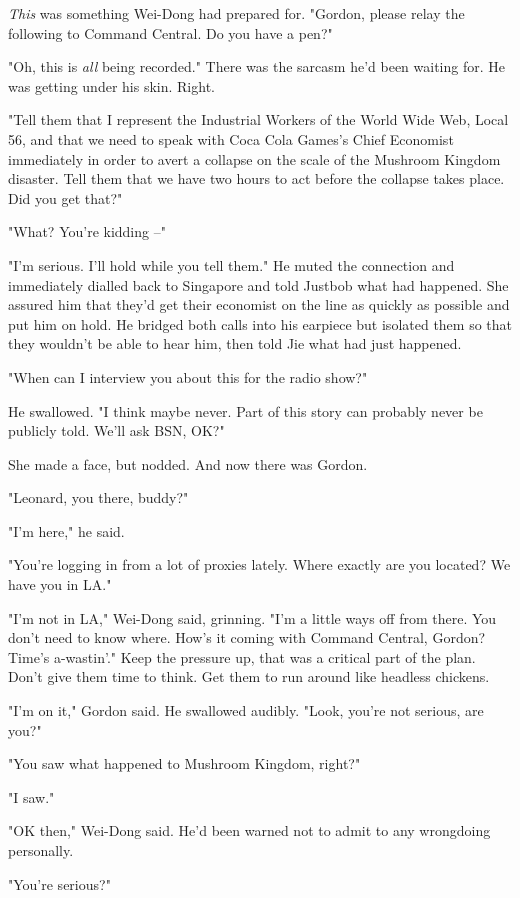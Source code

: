 \emph{This} was something Wei-Dong had prepared for. "Gordon,
please relay the following to Command Central. Do you have a pen?"

"Oh, this is \emph{all} being recorded." There was the sarcasm he'd
been waiting for. He was getting under his skin. Right.

"Tell them that I represent the Industrial Workers of the World
Wide Web, Local 56, and that we need to speak with Coca Cola
Games's Chief Economist immediately in order to avert a collapse on
the scale of the Mushroom Kingdom disaster. Tell them that we have
two hours to act before the collapse takes place. Did you get
that?"

"What? You're kidding --"

"I'm serious. I'll hold while you tell them." He muted the
connection and immediately dialled back to Singapore and told
Justbob what had happened. She assured him that they'd get their
economist on the line as quickly as possible and put him on hold.
He bridged both calls into his earpiece but isolated them so that
they wouldn't be able to hear him, then told Jie what had just
happened.

"When can I interview you about this for the radio show?"

He swallowed. "I think maybe never. Part of this story can probably
never be publicly told. We'll ask BSN, OK?"

She made a face, but nodded. And now there was Gordon.

"Leonard, you there, buddy?"

"I'm here," he said.

"You're logging in from a lot of proxies lately. Where exactly are
you located? We have you in LA."

"I'm not in LA," Wei-Dong said, grinning. "I'm a little ways off
from there. You don't need to know where. How's it coming with
Command Central, Gordon? Time's a-wastin'." Keep the pressure up,
that was a critical part of the plan. Don't give them time to
think. Get them to run around like headless chickens.

"I'm on it," Gordon said. He swallowed audibly. "Look, you're not
serious, are you?"

"You saw what happened to Mushroom Kingdom, right?"

"I saw."

"OK then," Wei-Dong said. He'd been warned not to admit to any
wrongdoing personally.

"You're serious?"

